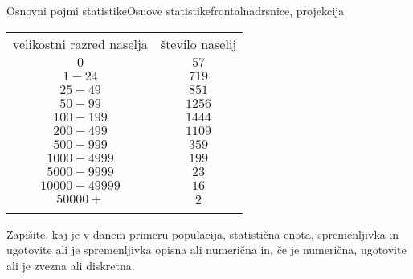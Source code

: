\begin{priprava}{1}{}{Osnovni pojmi statistike}{Osnove statistike}{frontalna}{drsnice, projekcija}
\begin{naloga}
                    \begin{table}[H]
                        \centering
                        \begin{tabular}{||c|c||} 
                        \hhline{|t:==:t|}
                        \rowcolor[rgb]{0.843,0.718,0.718} 
                        velikostni razred naselja  & število naselij   \\ 
                        \hhline{|:==:|}
                        $0$ & $57$    \\ 
                        \hline
                        $1-24$ & $719$    \\ 
                        \hline
                        $25-49$ & $851$    \\ 
                        \hline
                        $50-99$ & $1256$     \\
                        \hline
                        $100-199$ & $1444$     \\
                        \hline
                        $200-499$ & $1109$     \\
                        \hline
                        $500-999$ & $359$     \\
                        \hline
                        $1000-4999$ & $199$     \\
                        \hline
                        $5000-9999$ & $23$     \\
                        \hline
                        $10000-49999$ & $16$     \\                    
                        \hline
                        $50000+$ & $2$     \\
                        \hhline{|b:==:b|}
                        \end{tabular}
                    \end{table}
                
                    Zapišite, kaj je v danem primeru populacija, statistična enota, spremenljivka in ugotovite ali je spremenljivka opisna ali numerična in, 
                    če je numerična, ugotovite ali je zvezna ali diskretna.
            \end{naloga}



\end{priprava}